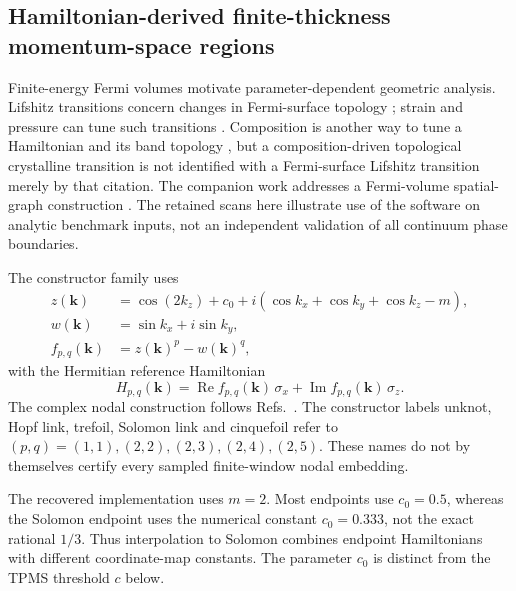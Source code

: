 \documentclass[10pt,twocolumn]{article}
\begin{document}
\subsection{Hamiltonian-derived finite-thickness momentum-space regions}
\label{supp:hamiltonian_phase_maps}
Finite-energy Fermi volumes motivate parameter-dependent geometric analysis. Lifshitz transitions concern changes in Fermi-surface topology \cite{kg_lifshitz1960,kg_varlamov2021lifshitz}; strain and pressure can tune such transitions \cite{kg_sunko2019lifshitz,kg_xiang2015lifshitz}. Composition is another way to tune a Hamiltonian and its band topology \cite{kg_dziawa2012topological}, but a composition-driven topological crystalline transition is not identified with a Fermi-surface Lifshitz transition merely by that citation. The companion work addresses a Fermi-volume spatial-graph construction \cite{akgun_yan_2026topologicalclassificationknottedgraphs}. The retained scans here illustrate use of the software on analytic benchmark inputs, not an independent validation of all continuum phase boundaries.

The constructor family uses
\begin{equation}
\begin{aligned}
z(\mathbf k)&=\cos(2k_z)+c_0+i\!\left(\cos k_x+\cos k_y+\cos k_z-m\right),\\
w(\mathbf k)&=\sin k_x+i\sin k_y,\\
f_{p,q}(\mathbf k)&=z(\mathbf k)^p-w(\mathbf k)^q,
\end{aligned}
\label{suppeq:nodal_pq_field}
\end{equation}
with the Hermitian reference Hamiltonian
\begin{equation}
H_{p,q}(\mathbf k)=\operatorname{Re}f_{p,q}(\mathbf k)\,\sigma_x+\operatorname{Im}f_{p,q}(\mathbf k)\,\sigma_z.
\label{suppeq:nodal_pq_hamiltonian}
\end{equation}
The complex nodal construction follows Refs.~\cite{kg_bi2017nodalknot,kg_lee2020nodalknots}. The constructor labels unknot, Hopf link, trefoil, Solomon link and cinquefoil refer to $(p,q)=(1,1),(2,2),(2,3),(2,4),(2,5)$. These names do not by themselves certify every sampled finite-window nodal embedding.

The recovered implementation uses $m=2$. Most endpoints use $c_0=0.5$, whereas the Solomon endpoint uses the numerical constant $c_0=0.333$, not the exact rational $1/3$. Thus interpolation to Solomon combines endpoint Hamiltonians with different coordinate-map constants. The parameter $c_0$ is distinct from the TPMS threshold $c$ below.
\end{document}
